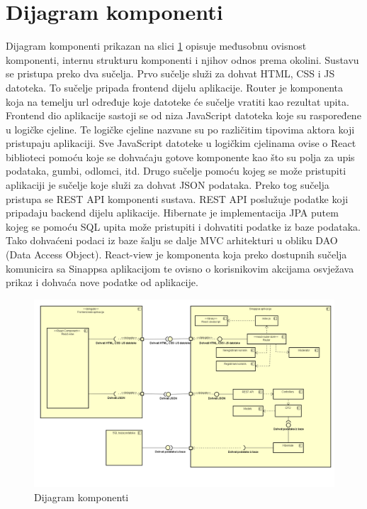 		\section{Dijagram komponenti}
		Dijagram komponenti prikazan na slici \ref{fig:dijagram konponenti} opisuje međusobnu ovisnost komponenti, internu strukturu komponenti i njihov odnos prema okolini. Sustavu se pristupa preko dva sučelja. Prvo sučelje služi za dohvat HTML, CSS i JS datoteka. To sučelje pripada frontend dijelu aplikacije. Router je komponenta koja na temelju url određuje koje datoteke će sučelje vratiti kao rezultat upita. Frontend dio aplikacije sastoji se od niza JavaScript datoteka koje su raspoređene u logičke cjeline. Te logičke cjeline nazvane su po različitim tipovima aktora koji pristupaju aplikaciji. Sve JavaScript datoteke u logičkim cjelinama ovise o React biblioteci pomoću koje se dohvaćaju gotove komponente kao što su polja za upis podataka, gumbi, odlomci, itd. Drugo sučelje pomoću kojeg se može pristupiti aplikaciji je sučelje koje služi za dohvat JSON podataka. Preko tog sučelja pristupa se REST API komponenti sustava. REST API poslužuje podatke koji pripadaju backend dijelu aplikacije. Hibernate je implementacija JPA putem kojeg se pomoću SQL upita može pristupiti i dohvatiti podatke iz baze podataka. Tako dohvaćeni podaci iz baze šalju se dalje MVC arhitekturi u obliku DAO (Data Access Object). React-view je komponenta koja preko dostupnih sučelja komunicira sa Sinappsa aplikacijom te ovisno o korisnikovim akcijama osvježava prikaz i dohvaća nove podatke od aplikacije.  
		
		\begin{figure}[H]
			\includegraphics[scale=0.31]{dijagrami/dijagram_komponenti.png}
			\centering
			\caption{Dijagram komponenti}
			\label{fig:dijagram konponenti}
		\end{figure}
		